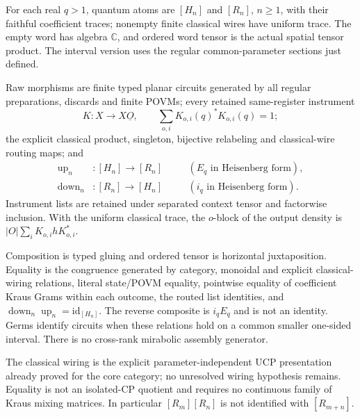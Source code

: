 \begin{definition}
For each real $q>1$, quantum atoms are $[H_n]$ and $[R_n]$, $n\geq1$, with
their faithful coefficient traces; nonempty finite classical wires have
uniform trace.  The empty word has algebra $\mathbb C$, and ordered word
tensor is the actual spatial tensor product.  The interval version uses the
regular common-parameter sections just defined.

Raw morphisms are finite typed planar circuits generated by all regular
preparations, discards and finite POVMs; every retained same-register
instrument
\[
 K:X\to X\underline O,
 \qquad \sum_{o,i}K_{o,i}(q)^*K_{o,i}(q)=1;
\]
the explicit classical product, singleton, bijective relabeling and
classical-wire routing maps; and
\[
 \begin{aligned}
 \operatorname{up}_n&:[H_n]\to[R_n]&&\quad(E_q\text{ in Heisenberg form}),\\
 \operatorname{down}_n&:[R_n]\to[H_n]&&\quad(i_q\text{ in Heisenberg form}).
 \end{aligned}
\]
Instrument lists are retained under separated context tensor and factorwise
inclusion.  With the uniform classical trace, the $o$-block of the output
density is $|O|\sum_iK_{o,i}hK_{o,i}^*$.

Composition is typed gluing and ordered tensor is horizontal juxtaposition.
Equality is the congruence generated by category, monoidal and explicit
classical-wiring relations, literal state/POVM equality, pointwise equality
of coefficient Kraus Grams within each outcome, the routed list identities,
and $\operatorname{down}_n\operatorname{up}_n=\mathrm{id}_{[H_n]}$.
The reverse composite is $i_qE_q$ and is not an identity.  Germs identify
circuits when these relations hold on a common smaller one-sided interval.
There is no cross-rank mirabolic assembly generator.
\end{definition}
\begin{scope}
The classical wiring is the explicit parameter-independent UCP presentation
already proved for the core category; no unresolved wiring hypothesis remains.
Equality is not an isolated-CP quotient and requires no continuous family of
Kraus mixing matrices.  In particular $[R_m][R_n]$ is not identified with
$[R_{m+n}]$.
\end{scope}

